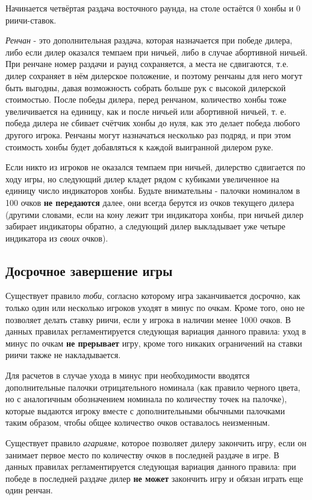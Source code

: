 Начинается четвёртая раздача восточного раунда, на столе остаётся 0 хонбы и 0 риичи-ставок.

\textit{Ренчан} - это дополнительная раздача, которая назначается при победе дилера, либо если дилер оказался темпаем при ничьей, либо в случае абортивной ничьей. При ренчане номер раздачи и раунд сохраняется, а места не сдвигаются, т.е. дилер сохраняет в нём дилерское положение, и поэтому ренчаны для него могут быть выгодны, давая возможность собрать больше рук с высокой дилерской стоимостью. После победы дилера, перед ренчаном, количество хонбы тоже увеличивается на единицу, как и после ничьей или абортивной ничьей, т. е. победа дилера не сбивает счётчик хонбы до нуля, как это делает победа любого другого игрока. Ренчаны могут назначаться несколько раз подряд, и при этом стоимость хонбы будет добавляться к каждой выигранной дилером руке.

Если никто из игроков не оказался темпаем при ничьей, дилерство сдвигается по ходу игры, но следующий дилер кладет рядом с кубиками увеличенное на единицу число индикаторов хонбы. Будьте внимательны - палочки номиналом в 100 очков \textbf{не передаются} далее, они всегда берутся из очков текущего дилера (другими словами, если на кону лежит три индикатора хонбы, при ничьей дилер забирает индикаторы обратно, а следующий дилер выкладывает уже четыре индикатора из \textit{своих} очков).

\subsection{Досрочное завершение игры}

Существует правило \textit{тоби}, согласно которому игра заканчивается досрочно, как только один или несколько игроков уходят в минус по очкам. Кроме того, оно не позволяет делать ставку риичи, если у игрока в наличии менее 1000 очков. В данных правилах регламентируется следующая вариация данного правила: уход в минус по очкам \textbf{не прерывает} игру, кроме того никаких ограничений на ставки риичи также не накладывается.

Для расчетов в случае ухода в минус при необходимости вводятся дополнительные палочки отрицательного номинала (как правило черного цвета, но с аналогичным обозначением номинала по количеству точек на палочке), которые выдаются игроку вместе с дополнительными обычными палочками таким образом, чтобы общее количество очков оставалось неизменным.

Существует правило \textit{агарияме}, которое позволяет дилеру закончить игру, если он занимает первое место по количеству очков в последней раздаче в игре. В данных правилах регламентируется следующая вариация данного правила: при победе в последней раздаче дилер \textbf{не может} закончить игру и обязан играть еще один ренчан.

